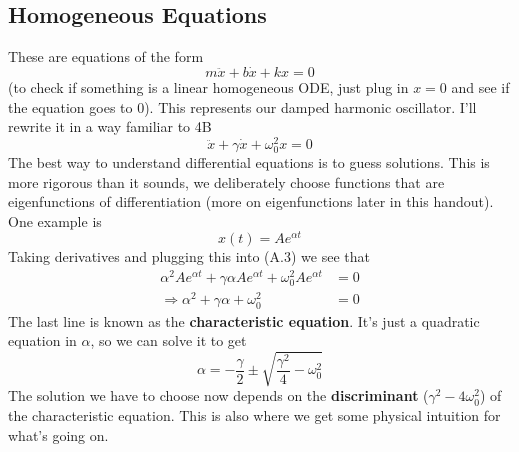 \documentclass{report}
\numberwithin{equation}{section}
\begin{document}
\subsection{Homogeneous Equations}
These are equations of the form
\begin{equation}
	m\ddot{x} + b\dot{x} + kx =0
\end{equation}
(to check if something is a linear homogeneous ODE, just plug in $x=0$ and see if the equation goes to 0).
This represents our damped harmonic oscillator. I'll rewrite it in a way familiar to 4B
\begin{equation}
	\ddot{x} + \gamma\dot{x} + \omega_0^2x=0
\end{equation}
The best way to understand differential equations is to guess solutions. This is more rigorous than it sounds, we deliberately choose functions that are eigenfunctions of differentiation (more on eigenfunctions later in this handout). One example is
\begin{equation}
	x(t) = Ae^{\alpha t}
\end{equation}
Taking derivatives and plugging this into (A.3) we see that
\begin{align*}
	\alpha^2Ae^{\alpha t} + \gamma\alpha Ae^{\alpha t} + \omega_0^2Ae^{\alpha t} &= 0\\
	\Rightarrow \alpha^2 + \gamma \alpha + \omega_0^2 &= 0
\end{align*}
The last line is known as the \textbf{characteristic equation}. It's just a quadratic equation in $\alpha$, so we can solve it to get
\begin{equation}
	\alpha = -\frac{\gamma}{2} \pm \sqrt{\frac{\gamma^2}{4} - \omega_0^2}
\end{equation}
The solution we have to choose now depends on the \textbf{discriminant} ($\gamma^2 - 4\omega_0^2$) of the characteristic equation. This is also where we get some physical intuition for what's going on.
\end{document}
